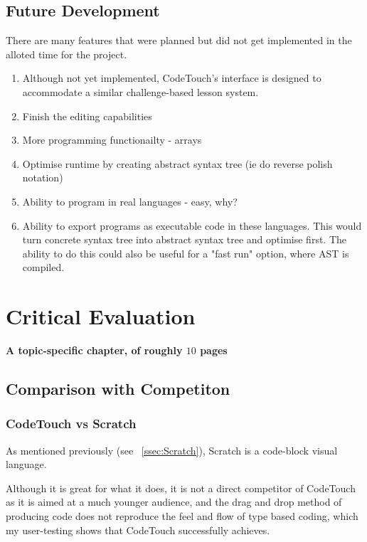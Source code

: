 \documentclass[ %
                    author={Jonathan Rankin},
                supervisor={Dr. David May, Dr. Ian Holyer},
                    degree={MEng},
                     title={CodeTouch},
                  subtitle={A Revolutionary Way To Program Real Code On Touch Screen Devices},
                      type={enterprise},
                      year={2015 } ]{dissertation}
\begin{document}
\begin{enumerate}
\section{Future Development}
There are many features that were planned but did not get implemented in the alloted time for the project. 
\begin{enumerate}
\item Although not yet implemented, CodeTouch's interface is designed to accommodate a similar challenge-based lesson system.
\item Finish the editing capabilities
\item More programming functionailty - arrays 
\item Optimise runtime by creating abstract syntax tree (ie do reverse polish notation)
\item Ability to program in real languages - easy, why?
\item Ability to export programs as executable code in these languages. This would turn concrete syntax tree into abstract syntax tree and optimise first. The ability to do this could also be useful for a "fast run" option, where AST is compiled. 
\end{enumerate}



\chapter{Critical Evaluation}
\label{chap:evaluation}

{\bf A topic-specific chapter, of roughly $10$ pages} 
\vspace{1cm} 

\noindent

\section{Comparison with Competiton}
\subsection{CodeTouch vs Scratch}
As mentioned previously (see ~\ref{ssec:Scratch}), Scratch is a code-block visual language. 

Although it is great for what it does, it is not a direct competitor of CodeTouch as it is aimed at a much younger audience, and the drag and drop method of producing code does not reproduce the feel and flow of type based coding, which my user-testing shows that CodeTouch successfully achieves. 


\end{enumerate}
\end{document}
